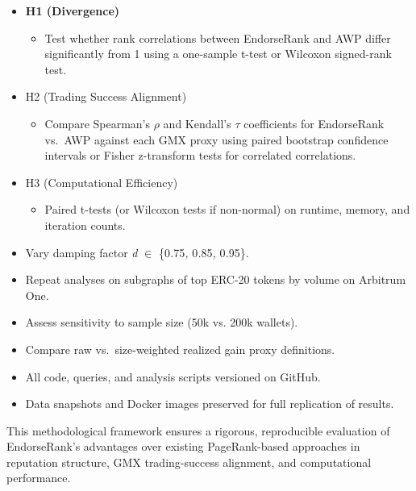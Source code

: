 \begin{itemize}
\item[\textbullet] \textbf{H1 (Divergence)}
\begin{itemize}
\item[\textendash] Test whether rank correlations between EndorseRank and AWP differ significantly from 1 using a one-sample t-test or Wilcoxon signed-rank test.
\end{itemize}
\item[\textbullet] H2 (Trading Success Alignment)
\begin{itemize}
\item[\textendash] Compare Spearman's \emph{\(\rho\) }and Kendall's \emph{\(\tau\) }coefficients for EndorseRank vs.\ AWP against each GMX proxy using paired bootstrap confidence intervals or Fisher z-transform tests for correlated correlations.
\end{itemize}
\item[\textbullet] H3 (Computational Efficiency)
\begin{itemize}
\item[\textendash] Paired t-tests (or Wilcoxon tests if non-normal) on runtime, memory, and iteration counts.
\end{itemize}
\end{itemize}

\begin{itemize}
\item[\textbullet] Vary damping factor \emph{d }\(\in\) \{0\emph{.}75\emph{, }0\emph{.}85\emph{, }0\emph{.}95\}.
\item[\textbullet] Repeat analyses on subgraphs of top ERC-20 tokens by volume on Arbitrum One.
\item[\textbullet] Assess sensitivity to sample size (50k vs. 200k wallets).
\item[\textbullet] Compare raw vs.\ size-weighted realized gain proxy definitions.
\end{itemize}

\begin{itemize}
\item[\textbullet] All code, queries, and analysis scripts versioned on GitHub.
\item[\textbullet] Data snapshots and Docker images preserved for full replication of results.
\end{itemize}
This methodological framework ensures a rigorous, reproducible evaluation of EndorseRank's advantages over existing PageRank-based approaches in reputation structure, GMX trading-success alignment, and computational performance.
